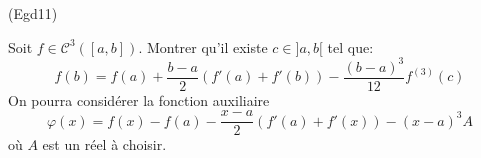 \begin{tiny}(Egd11)\end{tiny}
Soit $f\in \mathcal C^3([a,b])$. Montrer qu'il existe $c\in ]a,b[$ tel que:
\begin{displaymath}
 f(b)=f(a)+\frac{b-a}{2}\left( f'(a)+f'(b)\right) - \frac{(b-a)^3}{12}f^{(3)}(c)
\end{displaymath}
On pourra considérer la fonction auxiliaire
\begin{displaymath}
 \varphi(x)= f(x) -f(a) - \dfrac{x-a}{2}\left( f'(a)+f'(x)\right) - (x-a)^3A
\end{displaymath}
où $A$ est un réel à choisir.